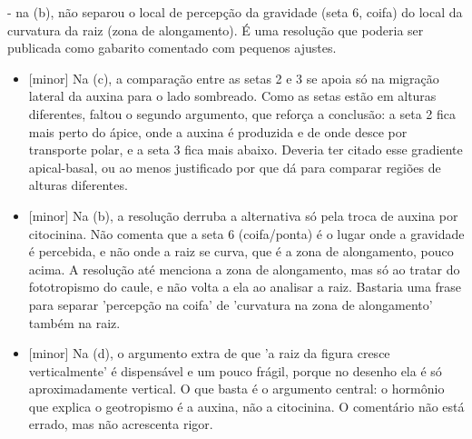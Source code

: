 \documentclass{article}%
\begin{document}
{-} na (b), não separou o local de percepção da gravidade (seta 6, coifa) do local da curvatura da raiz (zona de alongamento).\newline%
\newline%
É uma resolução que poderia ser publicada como gabarito comentado com pequenos ajustes.%
\begin{itemize}%
\item%
{[}minor{]} Na (c), a comparação entre as setas 2 e 3 se apoia só na migração lateral da auxina para o lado sombreado. Como as setas estão em alturas diferentes, faltou o segundo argumento, que reforça a conclusão: a seta 2 fica mais perto do ápice, onde a auxina é produzida e de onde desce por transporte polar, e a seta 3 fica mais abaixo. Deveria ter citado esse gradiente apical{-}basal, ou ao menos justificado por que dá para comparar regiões de alturas diferentes.%
\item%
{[}minor{]} Na (b), a resolução derruba a alternativa só pela troca de auxina por citocinina. Não comenta que a seta 6 (coifa/ponta) é o lugar onde a gravidade é percebida, e não onde a raiz se curva, que é a zona de alongamento, pouco acima. A resolução até menciona a zona de alongamento, mas só ao tratar do fototropismo do caule, e não volta a ela ao analisar a raiz. Bastaria uma frase para separar 'percepção na coifa' de 'curvatura na zona de alongamento' também na raiz.%
\item%
{[}minor{]} Na (d), o argumento extra de que 'a raiz da figura cresce verticalmente' é dispensável e um pouco frágil, porque no desenho ela é só aproximadamente vertical. O que basta é o argumento central: o hormônio que explica o geotropismo é a auxina, não a citocinina. O comentário não está errado, mas não acrescenta rigor.%
\end{itemize}%
\end{document}
